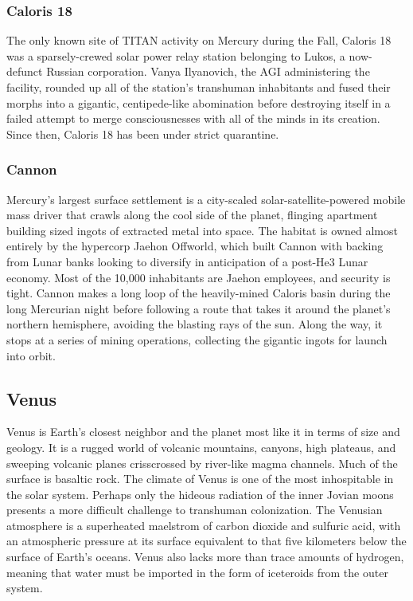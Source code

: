 \subsubsection{Caloris 18}

The only known site of TITAN activity on Mercury 
during the Fall, Caloris 18 was a sparsely-crewed solar 
power relay station belonging to Lukos, a now-defunct 
Russian corporation. Vanya Ilyanovich, the AGI administering
the facility, rounded up all of the station's
transhuman inhabitants and fused their morphs into a 
gigantic, centipede-like abomination before destroying 
itself in a failed attempt to merge consciousnesses with 
all of the minds in its creation. Since then, Caloris 18 
has been under strict quarantine.

\subsubsection{Cannon}

Mercury's largest surface settlement is a city-scaled 
solar-satellite-powered mobile mass driver that crawls 
along the cool side of the planet, flinging apartment 
building sized ingots of extracted metal into space. 
The habitat is owned almost entirely by the hypercorp 
Jaehon Offworld, which built Cannon with backing 
from Lunar banks looking to diversify in anticipation 
of a post-He3 Lunar economy. Most of the 10,000 
inhabitants are Jaehon employees, and security is 
tight. Cannon makes a long loop of the heavily-mined 
Caloris basin during the long Mercurian night before 
following a route that takes it around the planet's 
northern hemisphere, avoiding the blasting rays of 
the sun. Along the way, it stops at a series of mining 
operations, collecting the gigantic ingots for launch 
into orbit.

\subsection{Venus}

Venus is Earth's closest neighbor and the planet most 
like it in terms of size and geology. It is a rugged 
world of volcanic mountains, canyons, high plateaus, 
and sweeping volcanic planes crisscrossed by river-like
magma channels. Much of the surface is basaltic
rock. The climate of Venus is one of the most inhospitable
in the solar system. Perhaps only the hideous
radiation of the inner Jovian moons presents a more 
difficult challenge to transhuman colonization. The 
Venusian atmosphere is a superheated maelstrom of 
carbon dioxide and sulfuric acid, with an atmospheric 
pressure at its surface equivalent to that five kilometers
below the surface of Earth's oceans. Venus also
lacks more than trace amounts of hydrogen, meaning 
that water must be imported in the form of iceteroids 
from the outer system.

